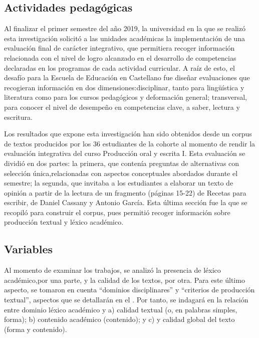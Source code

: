 \documentclass{textolivre-html}
\begin{document}
\subsection{Actividades pedagógicas}\label{sec-actividades}
Al finalizar el primer semestre del año 2019, la universidad en la que se
realizó esta investigación solicitó a las unidades académicas la implementación
de una evaluación final de carácter integrativo, que permitiera recoger
información relacionada con el nivel de logro alcanzado en el desarrollo de
competencias declaradas en los programas de cada actividad curricular. A raíz de
esto, el desafío para la Escuela de Educación en Castellano fue diseñar
evaluaciones que recogieran información en dos dimensiones:disciplinar, tanto
para lingüística y literatura como para los cursos pedagógicos y deformación
general; transversal, para conocer el nivel de desempeño en competencias clave,
a saber, lectura y escritura.

Los resultados que expone esta investigación han sido obtenidos desde un corpus
de textos producidos por los 36 estudiantes de la cohorte al momento de rendir
la evaluación integrativa del curso Producción oral y escrita I. Esta evaluación
se dividió en dos partes: la primera, que contenía preguntas de alternativas con
selección única,relacionadas con aspectos conceptuales abordados durante el
semestre; la segunda, que invitaba a los estudiantes a elaborar un texto de
opinión a partir de la lectura de un fragmento (páginas 15-22) de Recetas para
escribir, de Daniel Cassany y Antonio García. Esta última sección fue la que se
recopiló para construir el corpus, pues permitió recoger información sobre
producción textual y léxico académico.


\subsection{Variables}\label{sec-variables}
Al momento de examinar los trabajos, se analizó la presencia de léxico
académico,por una parte, y la calidad de los textos, por otra. Para este último
aspecto, se tomaron en cuenta “dominios disciplinares” y “criterios de
producción textual”, aspectos que se detallarán en el . Por tanto,
se indagará en la relación entre dominio léxico académico y a) calidad textual
(o, en palabras simples, forma); b) contenido académico (contenido); y c) y
calidad global del texto (forma y contenido).
\end{document}
